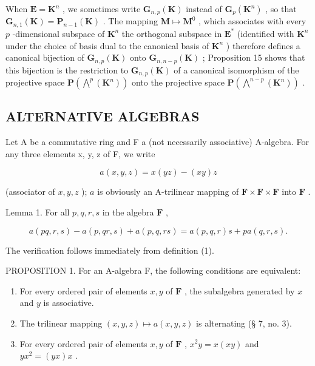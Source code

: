 When \(\mathbf{E} = \mathbf{K}^n\) , we sometimes write \(\mathbf{G}_{n,p}(\mathbf{K})\) instead of \(\mathbf{G}_p(\mathbf{K}^n)\) , so that \(\mathbf{G}_{n,1}(\mathbf{K}) = \mathbf{P}_{n-1}(\mathbf{K})\) . The mapping \(\mathbf{M} \mapsto \mathbf{M}^0\) , which associates with every \(p\) -dimensional subspace of \(\mathbf{K}^n\) the orthogonal subspace in \(\mathbf{E}^*\) (identified with \(\mathbf{K}^n\) under the choice of basis dual to the canonical basis of \(\mathbf{K}^n\) ) therefore defines a canonical bijection of \(\mathbf{G}_{n,p}(\mathbf{K})\) onto \(\mathbf{G}_{n,n-p}(\mathbf{K})\) ; Proposition 15 shows that this bijection is the restriction to \(\mathbf{G}_{n,p}(\mathbf{K})\) of a canonical isomorphism of the projective space \(\mathbf{P}(\bigwedge^p (\mathbf{K}^n))\) onto the projective space \(\mathbf{P}(\bigwedge^{n-p}(\mathbf{K}^n))\) .


\subsection{ALTERNATIVE ALGEBRAS}

Let A be a commutative ring and F a (not necessarily associative) A-algebra. For any three elements x, y, z of F, we write

\[
a (x, y, z) = x (y z) - (x y) z\tag{1}
\]

(associator of \(x, y, z\) ); \(a\) is obviously an A-trilinear mapping of \(\mathbf{F} \times \mathbf{F} \times \mathbf{F}\) into \(\mathbf{F}\) .

Lemma 1. For all \(p, q, r, s\) in the algebra \(\mathbf{F}\) ,

\[
a (p q, r, s) - a (p, q r, s) + a (p, q, r s) = a (p, q, r) s + p a (q, r, s).\tag{2}
\]

The verification follows immediately from definition (1).

PROPOSITION 1. For an A-algebra F, the following conditions are equivalent:

\begin{enumerate}
\def\labelenumi{(\alph{enumi})}
\item
  For every ordered pair of elements \(x, y\) of \(\mathbf{F}\) , the subalgebra generated by \(x\) and \(y\) is associative.
\item
  The trilinear mapping \((x, y, z) \mapsto a(x, y, z)\) is alternating (§ 7, no. 3).
\item
  For every ordered pair of elements \(x, y\) of \(\mathbf{F}\) , \(x^2y = x(xy)\) and \(yx^2 = (yx)x\) .
\end{enumerate}

